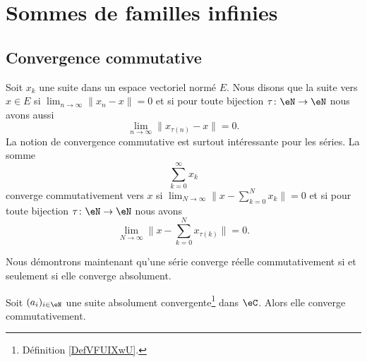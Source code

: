 \section{Sommes de familles infinies}
\label{SECooHHDXooUgLhHR}

\subsection{Convergence commutative}

\begin{definition}      \label{DEFooORAGooZslkyS}
	Soit \( x_k\) une suite dans un espace vectoriel normé \( E\). Nous disons que la suite  vers \( x\in E\) si \( \lim_{n\to \infty}\| x_n-x \| =0\) et si pour toute bijection \( \tau\colon \eN\to \eN\) nous avons aussi
	\begin{equation}
		\lim_{n\to \infty} \| x_{\tau(n)}-x \|=0.
	\end{equation}
	La notion de convergence commutative est surtout intéressante pour les séries. La somme
	\begin{equation}
		\sum_{k=0}^{\infty}x_k
	\end{equation}
	converge commutativement vers \( x\) si \( \lim_{N\to \infty} \| x-\sum_{k=0}^Nx_k \|=0\) et si pour toute bijection \( \tau\colon \eN\to \eN\) nous avons
	\begin{equation}
		\lim_{N\to \infty} \| x-\sum_{k=0}^Nx_{\tau(k)} \|=0.
	\end{equation}
\end{definition}

Nous démontrons maintenant qu'une série converge réelle commutativement si et seulement si elle converge absolument.

\begin{proposition} \label{PopriXWvIY}
	Soit \( (a_i)_{i\in \eN}\) une suite absolument convergente\footnote{Définition \ref{DefVFUIXwU}.} dans \( \eC\). Alors elle converge commutativement.
\end{proposition}

